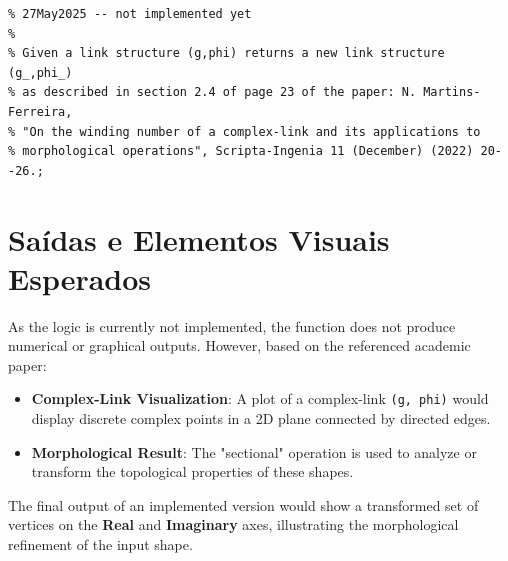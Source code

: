 \begin{lstlisting}
% 27May2025 -- not implemented yet
%
% Given a link structure (g,phi) returns a new link structure (g_,phi_)  
% as described in section 2.4 of page 23 of the paper: N. Martins-Ferreira, 
% "On the winding number of a complex-link and its applications to 
% morphological operations", Scripta-Ingenia 11 (December) (2022) 20--26.;
\end{lstlisting}

\section{Saídas e Elementos Visuais Esperados}



As the logic is currently not implemented, the function does not produce numerical or graphical outputs. However, based on the referenced academic paper:

\begin{itemize}
    \item \textbf{Complex-Link Visualization}: A plot of a complex-link \texttt{(g, phi)} would display discrete complex points in a 2D plane connected by directed edges.
    \item \textbf{Morphological Result}: The "sectional" operation is used to analyze or transform the topological properties of these shapes.
\end{itemize}

The final output of an implemented version would show a transformed set of vertices on the \textbf{Real} and \textbf{Imaginary} axes, illustrating the morphological refinement of the input shape.

